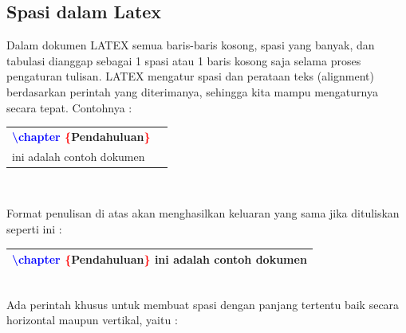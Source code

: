 \subsection{Spasi dalam Latex}
\begin{raggedleft}Dalam dokumen LATEX semua baris-baris kosong, spasi yang banyak, dan tabulasi dianggap sebagai 1 spasi atau 1 baris kosong saja selama proses pengaturan tulisan. LATEX mengatur spasi dan perataan teks (alignment) berdasarkan perintah yang diterimanya, sehingga kita mampu mengaturnya secara tepat. Contohnya :\end{raggedleft}
\begin{table}[h!]
\begin{tabular}{|p{5 cm} p{8 cm}|}
\hline
\bfseries{\textcolor{blue}{\textbackslash chapter}}\bfseries{\textcolor{red}{ \{}}Pendahuluan\bfseries{\textcolor{red}{\}}}& \\
ini adalah contoh dokumen &  \\
\hline
\end{tabular}
\end{table}
\\ \begin{raggedleft}Format penulisan di atas akan menghasilkan keluaran yang sama jika dituliskan seperti ini : \end{raggedleft}
\begin{table}[h!]
\begin{tabular}{|p{13.5 cm}|}
\hline
\bfseries{\textcolor{blue}{\textbackslash chapter}}  \bfseries{\textcolor{red}{\{}}Pendahuluan\bfseries{\textcolor{red}{\}}} ini adalah contoh dokumen \\
\hline
\end{tabular}
\end{table}
\\
Ada perintah khusus untuk membuat spasi dengan panjang tertentu baik secara horizontal maupun vertikal, yaitu :
